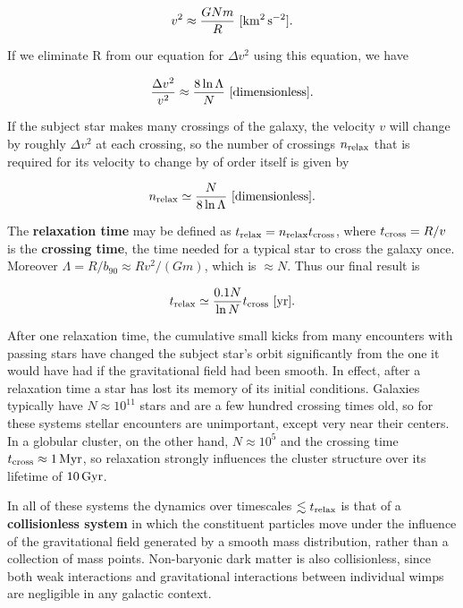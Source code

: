 \documentclass[a4paper,10pt]{article}
\begin{document}
\begin{align*}
    v^2 \approx \frac{GNm}{R} ~ [{\rm km^2\,s^{-2}}].
\end{align*}

{\noindent}If we eliminate R from our equation for $\Delta v^2$ using this equation, we have

\begin{align*}
    \frac{\Delta v^2}{v^2} \approx \frac{8\ln\Lambda}{N} ~ [{\rm dimensionless}].
\end{align*}

{\noindent}If the subject star makes many crossings of the galaxy, the velocity $v$ will change by roughly $\Delta v^2$ at each crossing, so the number of crossings $n_{\rm relax}$ that is required for its velocity to change by of order itself is given by

\begin{align*}
    n_{\rm relax} \simeq \frac{N}{8\ln\Lambda} ~ [{\rm dimensionless}].
\end{align*}

{\noindent}The \textbf{relaxation time} may be defined as $t_{\rm relax}=n_{\rm relax} t_{\rm cross}$, where $t_{\rm cross}=R/v$ is the \textbf{crossing time}, the time needed for a typical star to cross the galaxy once. Moreover $\Lambda=R/b_{90}\approx Rv^2/(Gm)$, which is $\approx N$. Thus our final result is

\begin{align*}
    t_{\rm relax} \simeq \frac{0.1N}{\ln N} t_{\rm cross} ~ [{\rm yr}].
\end{align*}

{\noindent}After one relaxation time, the cumulative small kicks from many encounters with passing stars have changed the subject star's orbit significantly from the one it would have had if the gravitational field had been smooth. In effect, after a relaxation time a star has lost its memory of its initial conditions. Galaxies typically have $N\approx10^{11}$ stars and are a few hundred crossing times old, so for these systems stellar encounters are unimportant, except very near their centers. In a globular cluster, on the other hand, $N\approx10^5$ and the crossing time $t_{\rm cross}\approx1\,{\rm Myr}$, so relaxation strongly influences the cluster structure over its lifetime of $10\,{\rm Gyr}$.

{\noindent}In all of these systems the dynamics over timescales $\lesssim t_{\rm relax}$ is that of a \textbf{collisionless system} in which the constituent particles move under the influence of the gravitational field generated by a smooth mass distribution, rather than a collection of mass points. Non-baryonic dark matter is also collisionless, since both weak interactions and gravitational interactions between individual wimps are negligible in any galactic context.
\end{document}
